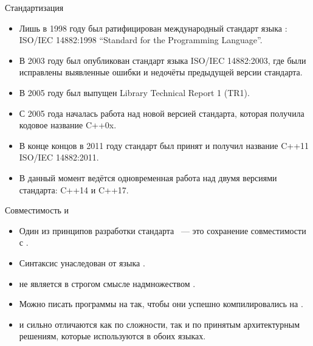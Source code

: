 \documentclass[aspectration=1610]{beamer}
\begin{document}
\begin{frame}{Стандартизация \langcpp}
    \begin{itemize}
        \item Лишь в 1998 году был ратифицирован международный стандарт языка 
            \langcpp: ISO/IEC 14882:1998 ``Standard for the \langcpp Programming
            Language''.
        
        \item В 2003 году был опубликован стандарт языка ISO/IEC 14882:2003, где были
            исправлены выявленные ошибки и недочёты предыдущей версии стандарта.

        \item В 2005 году был выпущен Library Technical Report 1 (TR1). 
            
        \item С 2005 года началась работа над новой версией стандарта, которая
            получила кодовое название C++0x. 
            
        \item В конце концов в 2011 году стандарт был принят и получил название
            C++11 ISO/IEC 14882:2011. 

        \item В данный момент ведётся одновременная работа над двумя версиями
        стандарта: C++14 и C++17.
    \end{itemize}
\end{frame}

\begin{frame}{Совместимость \langc и \langcpp}

    \begin{itemize}
        \item Один из принципов разработки стандарта \langcpp~— это
            сохранение совместимости с \langc. 
            
        \item Синтаксис \langcpp унаследован от языка \langc. 
            
        \item \langcpp не является в строгом смысле надмножеством \langc.
            
        \item Можно писать программы на \langc так, чтобы они успешно
            компилировались на \langcpp.
            
        \item \langc и \langcpp сильно отличаются как по сложности, так и по принятым 
            архитектурным решениям, которые используются в обоих языках.
    \end{itemize}
\end{frame}
\end{document}
